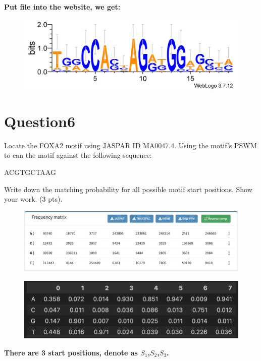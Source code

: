 \documentclass{article}
\begin{document}
\textbf{Put file into the website, we get:}


\begin{figure}[H]
    \centering
    \includegraphics[width=1\textwidth]{logo.png}
\end{figure}

\section{Question6}
Locate the FOXA2 motif using JASPAR ID MA0047.4. Using the motif’s PSWM to can the motif against the following sequence:

ACGTGCTAAG

Write down the matching probability for all possible motif start positions. Show your work. (3 pts).


\begin{figure}[H]
    \centering
    \includegraphics[width=1\textwidth]{q6.png}

\end{figure}

\begin{figure}[H]
    \centering
    \includegraphics[width=1\textwidth]{q6freq.png}

\end{figure}

\textbf{
There are 3 start positions, denote as $ S_1$,$S_2$,$S_3$.}
\end{document}
